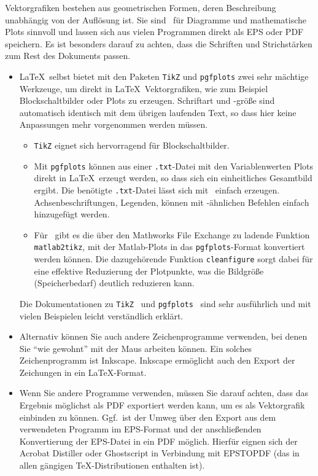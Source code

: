Vektorgrafiken bestehen aus geometrischen Formen, deren Beschreibung unabhängig von der Auflösung ist. Sie sind \zB\ für Diagramme und mathematische Plots sinnvoll und lassen sich aus vielen Programmen direkt als EPS oder PDF speichern.
Es ist besonders darauf zu achten, dass die Schriften und Strichstärken zum Rest des Dokuments passen.

\renewcommand{\labelitemi}{$\bullet$}

\begin{itemize}
  \item \LaTeX\ selbst bietet mit den Paketen \texttt{TikZ} und \texttt{pgfplots} zwei sehr mächtige Werkzeuge, um direkt in \LaTeX\ Vektorgrafiken, wie zum Beispiel Blockschaltbilder oder Plots zu erzeugen.
    Schriftart und -größe sind automatisch identisch mit dem übrigen laufenden Text, so dass hier keine Anpassungen mehr vorgenommen werden müssen.
    \begin{itemize}
      \item \texttt{TikZ} eignet sich hervorragend für Blockschaltbilder.
      \item Mit \texttt{pgfplots} können aus einer \texttt{.txt}-Datei mit den Variablenwerten Plots direkt in \LaTeX\ erzeugt werden, so dass sich ein einheitliches Gesamtbild ergibt.
        Die benötigte \texttt{.txt}-Datei lässt sich mit \Matlab\ einfach erzeugen.
        Achsenbeschriftungen, Legenden, \etc können mit \Matlab-ähnlichen Befehlen einfach hinzugefügt werden.
      \item Für \Matlab\ gibt es die über den Mathworks File Exchange zu ladende Funktion \verb|matlab2tikz|, mit der Matlab-Plots in das \texttt{pgfplots}-Format konvertiert werden können.
        Die dazugehörende Funktion \verb|cleanfigure| sorgt dabei für eine effektive Reduzierung der Plotpunkte, was die Bildgröße (Speicherbedarf) deutlich reduzieren kann.
    \end{itemize}
    Die Dokumentationen zu \texttt{TikZ}~\cite{TikZ} und \texttt{pgfplots}~\cite{pgfplots} sind sehr ausführlich und mit vielen Beispielen leicht verständlich erklärt.
  \item Alternativ können Sie auch andere Zeichenprogramme verwenden, bei denen Sie "`wie gewohnt"' mit der Maus arbeiten können.
    Ein solches Zeichenprogramm ist \zB Inkscape.
    Inkscape ermöglicht auch den Export der Zeichungen in ein \LaTeX-Format.
  \item Wenn Sie andere Programme verwenden, müssen Sie darauf achten, dass das Ergebnis möglichst als PDF exportiert werden kann, um es als Vektorgrafik einbinden zu können.
    Ggf.\ ist der Umweg über den Export aus dem verwendeten Programm im EPS-Format und der anschließenden Konvertierung der EPS-Datei in ein PDF möglich.
    Hierfür eignen sich der Acrobat Distiller oder Ghostscript in Verbindung mit EPSTOPDF (das in allen gängigen TeX-Distributionen enthalten ist).
\end{itemize}



